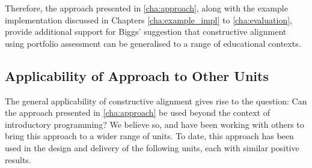 Therefore, the approach presented in \cref{cha:approach}, along with the example implementation discussed in Chapters \ref{cha:example_impl} to \ref{cha:evaluation}, provide additional support for Biggs' suggestion that constructive alignment using portfolio assessment can be generalised to a range of educational contexts.




\subsection{Applicability of Approach to Other Units} %
 \label{sub:applicability_of_approach_to_other_units}
 

The general applicability of constructive alignment gives rise to the question: Can the approach presented in \cref{cha:approach} be used beyond the context of introductory programming? We believe so, and have been working with others to bring this approach to a wider range of units. To date, this approach has been used in the design and delivery of the following units, each with similar positive results.

